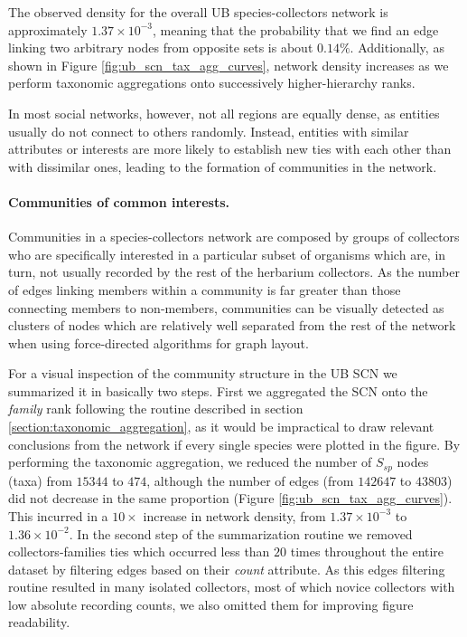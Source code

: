 The observed density for the overall UB species-collectors network is approximately $1.37 \times 10^{-3}$, meaning that the probability that we find an edge linking two arbitrary nodes from opposite sets is about $0.14\%$. Additionally, as shown in Figure \ref{fig:ub_scn_tax_agg_curves}, network density increases as we perform taxonomic aggregations onto successively higher-hierarchy ranks.

In most social networks, however, not all regions are equally dense, as entities usually do not connect to others randomly. Instead, entities with similar attributes or interests are more likely to establish new ties with each other than with dissimilar ones, leading to the formation of communities in the network.


\paragraph*{Communities of common interests.}
Communities in a species-collectors network are composed by groups of collectors who are specifically interested in a particular subset of organisms which are, in turn, not usually recorded by the rest of the herbarium collectors. 
As the number of edges linking members within a community is far greater than those connecting members to non-members, communities can be visually detected as clusters of nodes which are relatively well separated from the rest of the network when using force-directed algorithms \cite{Jacomy2014} for graph layout.

For a visual inspection of the community structure in the UB SCN we summarized it in basically two steps.
First we aggregated the SCN onto the \textit{family} rank following the routine described in section \ref{section:taxonomic_aggregation}, as it would be impractical to draw relevant conclusions from the network if every single species were plotted in the figure.
By performing the taxonomic aggregation, we reduced the number of $S_{sp}$ nodes (taxa) from $15344$ to $474$, although the number of edges (from $142647$ to $43803$) did not decrease in the same proportion (Figure \ref{fig:ub_scn_tax_agg_curves}).
This incurred in a $10 \times$ increase in network density, from $1.37\times 10^{-3}$ to $1.36\times 10^{-2}$.
In the second step of the summarization routine we removed collectors-families ties which occurred less than $20$ times throughout the entire dataset by filtering edges based on their \textit{count} attribute.
As this edges filtering routine resulted in many isolated collectors, most of which novice collectors with low absolute recording counts, we also omitted them for improving figure readability.

